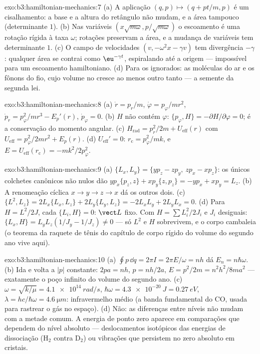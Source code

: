 \begin{solution}{exo:b3:hamiltonian-mechanics:7}
(a) A aplicação $(q, p) \mapsto (q + pt/m, p)$ é um cisalhamento: a
base e a altura do retângulo não mudam, e a área tampouco (determinante $1$).
(b) Nas variáveis $(x\sqrt{m\omega}, p/\sqrt{m\omega})$ o escoamento é
uma rotação rígida à taxa $\omega$; rotações preservam a área, e a
mudança de variáveis tem determinante $1$. (c) O campo de velocidades
$(v, -\omega^2x - \gamma v)$ tem divergência $-\gamma$: qualquer área
se contrai como $\eu^{-\gamma t}$, espiralando até a origem ---
impossível para um escoamento hamiltoniano. (d) Para os  ignorados: as moléculas do ar e os fônons do fio, cujo volume
no  cresce ao menos outro tanto --- a semente da segunda
lei.
\end{solution}

\begin{solution}{exo:b3:hamiltonian-mechanics:8}
(a) $\dot r = p_r/m$, $\dot\varphi = p_\varphi/mr^2$, $\dot p_r =
p_\varphi^2/mr^3 - E_p'(r)$, $\dot p_\varphi = 0$. (b) $H$ não contém
$\varphi$: $\{p_\varphi, H\} = -\partial H/\partial\varphi =
0$; é a conservação do momento angular. (c) $H_{\text{rad}} = p_r^2/2m +
U_{\text{eff}}(r)$ com $U_{\text{eff}} = p_\varphi^2/2mr^2 + E_p(r)$.
(d) $U_{\text{eff}}' = 0$: $r_{\text{c}} = p_\varphi^2/mk$, e $E =
U_{\text{eff}}(r_{\text{c}}) = -mk^2/2p_\varphi^2$.
\end{solution}

\begin{solution}{exo:b3:hamiltonian-mechanics:9}
(a) $\{L_x, L_y\} = \{yp_z - zp_y,\ zp_x - xp_z\}$: os únicos
colchetes canônicos não nulos dão $yp_x\{p_z, z\} + xp_y\{z,
p_z\} = -yp_x + xp_y = L_z$. (b) A renomeação cíclica $x \to y \to z \to
x$ dá os outros dois. (c) $\{L^2, L_z\} = 2L_x\{L_x, L_z\} +
2L_y\{L_y, L_z\} = -2L_xL_y + 2L_yL_x = 0$. (d) Para $H = L^2/2J$,
cada $\{L_i, H\} = 0$: $\vect L$ fixo. Com $H = \sum L_i^2/2J_i$
e $J_i$ desiguais: $\{L_x, H\} = L_yL_z(1/J_y - 1/J_z) \neq 0$ ---
só $L^2$ e $H$ sobrevivem, e o corpo cambaleia (o teorema da raquete
de tênis do capítulo de corpo rígido do volume do segundo ano vive aqui).
\end{solution}

\begin{solution}{exo:b3:hamiltonian-mechanics:10}
(a) $\oint p\,\dd q = 2\pi I = 2\pi E/\omega = nh$ dá $E_n =
n\hbar\omega$. (b) Ida e volta a $|p|$ constante: $2pa = nh$, $p =
nh/2a$, $E = p^2/2m = n^2h^2/8ma^2$ --- exatamente o poço infinito do
volume do segundo ano. (c) $\omega = \sqrt{k/\mu} = \qty{4.1e14}{rad/s}$,
$\hbar\omega = \qty{4.3e-20}{J} = \qty{0.27}{eV}$, $\lambda = hc/
\hbar\omega = \qty{4.6}{\micro m}$: infravermelho médio (a banda
fundamental do CO, usada para rastrear o gás no espaço). (d) Não: as
diferenças entre níveis não mudam com a metade comum. A energia de
ponto zero aparece em comparações que dependem do nível absoluto ---
deslocamentos isotópicos das energias de dissociação (H$_2$ contra
D$_2$) ou vibrações que persistem no zero absoluto em cristais.
\end{solution}

